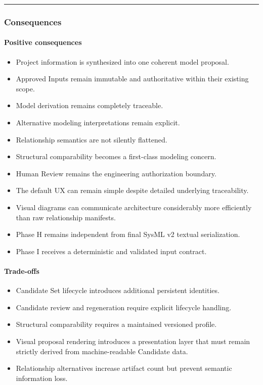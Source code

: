 \begin{center}\rule{0.5\linewidth}{0.5pt}\end{center}

\hypertarget{consequences-3}{%
\subsubsection{Consequences}\label{consequences-3}}

\hypertarget{positive-consequences-3}{%
\paragraph{Positive consequences}\label{positive-consequences-3}}

\begin{itemize}
\tightlist
\item
  Project information is synthesized into one coherent model proposal.
\item
  Approved Inputs remain immutable and authoritative within their existing scope.
\item
  Model derivation remains completely traceable.
\item
  Alternative modeling interpretations remain explicit.
\item
  Relationship semantics are not silently flattened.
\item
  Structural comparability becomes a first-class modeling concern.
\item
  Human Review remains the engineering authorization boundary.
\item
  The default UX can remain simple despite detailed underlying traceability.
\item
  Visual diagrams can communicate architecture considerably more efficiently than raw relationship manifests.
\item
  Phase H remains independent from final SysML v2 textual serialization.
\item
  Phase I receives a deterministic and validated input contract.
\end{itemize}

\hypertarget{trade-offs}{%
\paragraph{Trade-offs}\label{trade-offs}}

\begin{itemize}
\tightlist
\item
  Candidate Set lifecycle introduces additional persistent identities.
\item
  Candidate review and regeneration require explicit lifecycle handling.
\item
  Structural comparability requires a maintained versioned profile.
\item
  Visual proposal rendering introduces a presentation layer that must remain strictly derived from machine-readable Candidate data.
\item
  Relationship alternatives increase artifact count but prevent semantic information loss.
\end{itemize}

